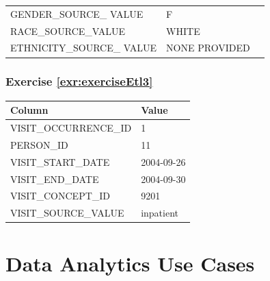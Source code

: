 \documentclass[11pt]{book}
\theoremstyle{definition}
\theoremstyle{definition}
\theoremstyle{definition}
\theoremstyle{remark}
\begin{document}
\begin{longtable}[]{@{}lll@{}}
\begin{minipage}[t]{0.23\columnwidth}
GENDER\_SOURCE\_ VALUE\strut
\end{minipage} & \begin{minipage}[t]{0.16\columnwidth}\raggedright\strut
F\strut
\end{minipage} & \begin{minipage}[t]{0.32\columnwidth}\raggedright\strut
\strut
\end{minipage}\tabularnewline
\begin{minipage}[t]{0.23\columnwidth}\raggedright\strut
RACE\_SOURCE\_VALUE\strut
\end{minipage} & \begin{minipage}[t]{0.16\columnwidth}\raggedright\strut
WHITE\strut
\end{minipage} & \begin{minipage}[t]{0.32\columnwidth}\raggedright\strut
\strut
\end{minipage}\tabularnewline
\begin{minipage}[t]{0.23\columnwidth}\raggedright\strut
ETHNICITY\_SOURCE\_ VALUE\strut
\end{minipage} & \begin{minipage}[t]{0.16\columnwidth}\raggedright\strut
NONE PROVIDED\strut
\end{minipage} & \begin{minipage}[t]{0.32\columnwidth}\raggedright\strut
\strut
\end{minipage}\tabularnewline
\bottomrule
\end{longtable}

\subsubsection*{Exercise
\ref{exr:exerciseEtl3}}\label{exercise-refexrexerciseetl3}

\begin{longtable}[]{@{}ll@{}}
\toprule
Column & Value\tabularnewline
\midrule
\endhead
VISIT\_OCCURRENCE\_ID & 1\tabularnewline
PERSON\_ID & 11\tabularnewline
VISIT\_START\_DATE & 2004-09-26\tabularnewline
VISIT\_END\_DATE & 2004-09-30\tabularnewline
VISIT\_CONCEPT\_ID & 9201\tabularnewline
VISIT\_SOURCE\_VALUE & inpatient\tabularnewline
\bottomrule
\end{longtable}

\section{Data Analytics Use Cases}\label{UseCasesanswers}
\end{document}
